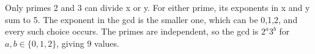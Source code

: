 Only primes 2 and 3 can divide x or y. For either prime, its exponents in x and y sum to 5. The exponent in the gcd is the smaller one, which can be 0,1,2, and every such choice occurs. The primes are independent, so the gcd is $2^a 3^b$ for $a,b\in\{0,1,2\}$, giving $\boxed 9$ values.
